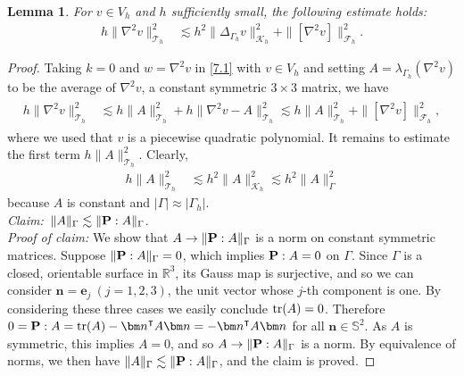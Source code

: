 \documentclass[10pt, a4paper]{amsart}
\newcommand{\bn}{{\bm n}}
\newcommand{\bbR}{\mathbb{R}}
\newcommand{\nab}{\nabla}
\newcommand{\calT}{\mathcal{T}}
\newcommand{\calF}{\mathcal{F}}
\newcommand{\calK}{\mathcal{K}}
\newtheorem{lemma}[theorem]{Lemma}
\theoremstyle{definition}
\theoremstyle{remark}
\theoremstyle{example}
\numberwithin{equation}{section}
\begin{document}
\begin{lemma} \label{lem:72}
For $v \in V_h$ and $h$ sufficiently small, the following estimate holds:
\begin{align} \label{lem-7.2}
h\|\nab^2v\|_{\calT_h}^2
& \lesssim h^2\|\Delta_{\Gamma_h}v\|_{\calK_h}^2 + \|[\nab^2v]\|_{\calF_h}^2.
\end{align}
\end{lemma}
%
\begin{proof}
Taking $k = 0$ and $w = \nab^2 v$ in \eqref{7.1} with $v\in V_h$ and setting $A = \lambda_{\Gamma_h}(\nab^2v)$ to be the average of $\nab^2v$, a constant symmetric $3\times 3$ matrix, we have
\begin{align} \label{7.8}
\begin{split}
h\|\nab^2v\|_{\calT_h}^2
& \lesssim h\|A\|_{\calT_h}^2 + h\|\nab^2v - A\|_{\calT_h}^2
 \lesssim h\|A\|_{\calT_h}^2 + \|[\nab^2v]\|_{\calF_h}^2,
\end{split}
\end{align}
where we used that $v$ is a piecewise quadratic polynomial.
%
It remains to estimate the first term $h\|A\|_{\calT_h}^2$. Clearly,
\begin{align}
h\|A\|_{\calT_h}^2
& \lesssim h^2\|A\|_{\calK_h}^2 \lesssim h^2 \|A\|_{\Gamma}^2 \label{7.9}
\end{align}
because $A$ is constant and $|\Gamma| \approx |\Gamma_h|$.\\
%
{\em Claim:}\ $\|A\|_\Gamma \lesssim \|{\bf P} : A\|_\Gamma$.\\
{\em Proof of claim:}
We show that $A\to \|{\bf P} : A\|_\Gamma$ is a norm on constant symmetric matrices.
Suppose $\|{\bf P} : A \|_\Gamma = 0$, which implies ${\bf P} : A = 0$ on $\Gamma$. Since $\Gamma$ is a closed, orientable surface in $\bbR^3$, its Gauss map is surjective, and so we can consider $\bn = {\bm e}_j\ (j = 1, 2, 3)$, the unit vector whose $j$-th component is one. By considering these three cases we easily conclude ${\rm tr}(A) = 0$. Therefore $0 = {\bf P} : A = {\rm tr}(A) - \bn^\intercal A \bn = - \bn^\intercal A \bn$ for all $\bn \in \mathbb{S}^2$. As $A$ is symmetric,  this implies $A = 0$, and so $A\to \|{\bf P} : A\|_\Gamma$ is a norm. By equivalence of norms, we then have $\|A\|_\Gamma \lesssim \|{\bf P} : A\|_\Gamma$, and the claim is proved. 


\end{proof}
\end{document}
